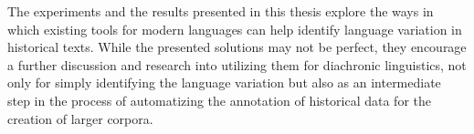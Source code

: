 The experiments and the results presented in this thesis explore the ways in which existing tools for modern languages can help identify language variation in historical texts. While the presented solutions may not be perfect, they encourage a further discussion and research into utilizing them for diachronic linguistics, not only for simply identifying the language variation but also as an intermediate step in the process of automatizing the annotation of historical data for the creation of larger corpora. 




